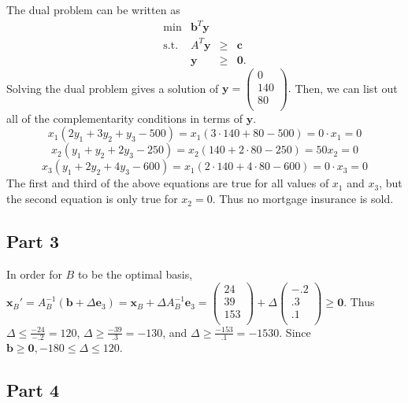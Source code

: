 \documentclass{article}
\begin{document}
The dual problem can be written as
\[
\begin{array}{rrcl}
  \min & \mathbf{b}^T \mathbf{y}\\
 \mbox{s.t.}  &  A^T \mathbf{y}  & \ge & \mathbf{c}~\\
 & \mathbf{y} & \ge & \mathbf{0}.
\end{array}
\]
Solving the dual problem gives a solution of $\mathbf{y} = \left( \begin{array}{c} 0\\ 140\\ 80\\ \end{array} \right).$ Then, we can list out all of the complementarity conditions in terms of $\mathbf{y}$.
$$x_1(2y_1 + 3y_2 + y_3 - 500) = x_1(3 \cdot 140 + 80 - 500) = 0 \cdot x_1 = 0$$
$$x_2(y_1 + y_2 + 2y_3 - 250) = x_2(140 + 2 \cdot 80 - 250) = 50x_2 = 0$$
$$x_3(y_1 + 2y_2 + 4y_3 - 600) = x_1(2 \cdot 140 + 4 \cdot 80 - 600) = 0 \cdot x_3 = 0$$
The first and third of the above equations are true for all values of $x_1$ and $x_3$, but the second equation is only true for $x_2 = 0$. Thus no mortgage insurance is sold.

\subsection{Part 3}

In order for $B$ to be the optimal basis, $\mathbf{x}_B' = A_B^{-1}(\mathbf{b} + \Delta \mathbf{e}_3) = \mathbf{x}_B + \Delta A_B^{-1} \mathbf{e}_3 = \left( \begin{array}{c} 24\\ 39\\ 153\\ \end{array} \right) + \Delta \left( \begin{array}{c} -.2\\ .3\\ .1\\ \end{array} \right) \ge \mathbf{0}$. Thus $\Delta \le \frac{-24}{-.2} = 120$, $\Delta \ge \frac{-39}{.3} = -130$, and $\Delta \ge \frac{-153}{.1} = -1530$. Since $\mathbf{b} \ge \mathbf{0}, -180 \le \Delta \le 120$.

\subsection{Part 4}
\end{document}
